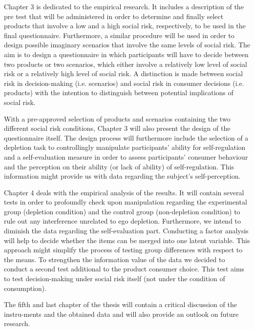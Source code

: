 Chapter 3 is dedicated to the empirical research. It includes a description of the pre test that will be administered in order to determine and finally select products that involve a low and a high social risk, respectively, to be used in the final questionnaire. Furthermore, a similar procedure will be used in order to design possible imaginary scenarios that involve the same levels of social risk. The aim is to design a questionnaire in which participants will have to decide between two products or two scenarios, which either involve a relatively low level of social risk or a relatively high level of social risk. A distinction is made between social risk in decision-making \citep{danziger2011extraneous} (i.e. scenarios) and social risk in consumer decisions (i.e. products) with the intention to distinguish between potential implications of social risk.\par
With a pre-approved selection of products and scenarios containing the two different social risk conditions, Chapter 3 will also present the design of the questionnaire itself. The design process will furthermore include the selection of a depletion task to controllingly manipulate participants’ ability for self-regulation and a self-evaluation measure in order to assess participants’ consumer behaviour and the perception on their ability (or lack of ability) of self-regulation. This information might provide us with data regarding the subject’s self-perception.\par
Chapter 4 deals with the empirical analysis of the results. It will contain several tests in order to profoundly check upon manipulation regarding the experimental group (depletion condition) and the control group (non-depletion condition) to rule out any interference unrelated to ego depletion. Furthermore, we intend to diminish the data regarding the self-evaluation part. Conducting a factor analysis will help to decide whether the items can be merged into one latent variable. This approach might simplify the process of testing group differences with respect to the means. To strengthen the information value of the data we decided to conduct a second test additional to the product consumer choice. This test aims to test decision-making under social risk itself  (not under the condition of consumption).\par
The fifth and last chapter of the thesis will contain a critical discussion of the instru-ments and the obtained data and will also provide an outlook on future research.\par